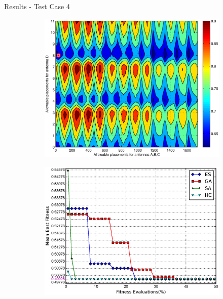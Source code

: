 \documentclass{beamer}
\begin{document}
\begin{frame}{Results - Test Case 4}
    \begin{figure}
        \centering
        \begin{subfigure}{.5\columnwidth}
            \includegraphics[width=\columnwidth,height=\columnwidth]{../paper/FIG/tc4_contour}%
        \end{subfigure}\hfill%
        \begin{subfigure}{.5\columnwidth}
            \includegraphics[width=\columnwidth, height=\columnwidth]{../paper/FIG/tc4_mf}%
        \end{subfigure}\hfill\\%
    \end{figure}
\end{frame}
\end{document}
